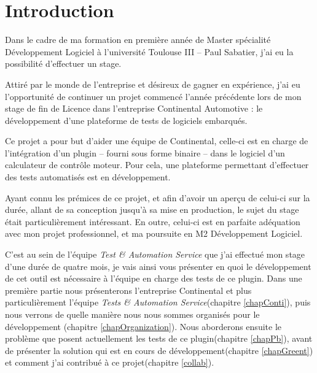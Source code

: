 \chapter*{Introduction}
Dans le cadre de ma formation en première année de Master spécialité Développement Logiciel à l'université Toulouse III – Paul Sabatier, j'ai eu la possibilité d'effectuer un stage.


Attiré par le monde de l'entreprise et désireux de gagner en expérience, j'ai eu l'opportunité de continuer un projet commencé l'année précédente lors de mon stage de fin de Licence dans l'entreprise Continental Automotive : le développement d'une plateforme de tests de logiciels embarqués.

Ce projet a pour but d'aider une équipe de Continental, celle-ci est en charge de l'intégration d'un plugin -- fourni sous forme binaire -- dans le logiciel d'un calculateur de contrôle moteur. Pour cela, une plateforme permettant d'effectuer des tests automatisés est en développement.

Ayant connu les prémices de ce projet, et afin d'avoir un aperçu de celui-ci sur la durée, allant de sa conception jusqu'à sa mise en production, le sujet du stage était particulièrement intéressant. En outre, celui-ci est en parfaite adéquation avec mon projet professionnel, et ma poursuite en M2 Développement Logiciel.

C'est au sein de l'équipe \textit{Test \& Automation Service} que j'ai effectué mon stage d'une durée de quatre mois, je vais ainsi vous présenter en quoi le développement de cet outil est nécessaire à l'équipe en charge des tests de ce plugin. Dans une première partie nous présenterons l'entreprise Continental et plus particulièrement l'équipe \textit{Tests \& Automation Service}(chapitre \ref{chapConti}), puis nous verrons de quelle manière nous nous sommes organisés pour le développement (chapitre \ref{chapOrganization}). Nous aborderons ensuite le problème que posent actuellement les tests de ce plugin(chapitre \ref{chapPb}), avant de présenter la solution qui est en cours de développement(chapitre \ref{chapGreent}) et comment j'ai contribué à ce projet(chapitre \ref{collab}). 
